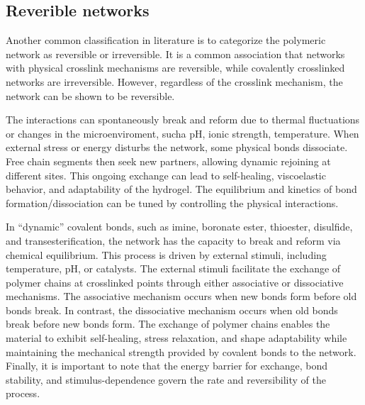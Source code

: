 \subsection{Reverible networks}

Another common classification in literature is to categorize the polymeric network as reversible or irreversible.
It is a common association that networks with physical crosslink mechanisms are reversible, while covalently crosslinked networks are irreversible.
However, regardless of the crosslink mechanism, the network can be shown to be reversible.

The interactions can spontaneously break and reform due to thermal fluctuations or changes in the microenviroment, sucha pH, ionic strength, temperature.
When external stress or energy disturbs the network, some physical bonds dissociate. 
Free chain segments then seek new partners, allowing dynamic rejoining at different sites. 
This ongoing exchange can lead to self-healing, viscoelastic behavior, and adaptability of the hydrogel.
The equilibrium and kinetics of bond formation/dissociation can be tuned by controlling the physical interactions.

In ``dynamic'' covalent bonds, such as imine, boronate ester, thioester, disulfide, and transesterification, the network has the capacity to break and reform via chemical equilibrium. 
This process is driven by external stimuli, including temperature, pH, or catalysts.
The external stimuli facilitate the exchange of polymer chains at crosslinked points through either associative or dissociative mechanisms.
The associative mechanism occurs when new bonds form before old bonds break. In contrast, the dissociative mechanism occurs when old bonds break before new bonds form.
The exchange of polymer chains enables the material to exhibit self-healing, stress relaxation, and shape adaptability while maintaining the mechanical strength provided by covalent bonds to the network.
Finally, it is important to note that the energy barrier for exchange, bond stability, and stimulus-dependence govern the rate and reversibility of the process.


